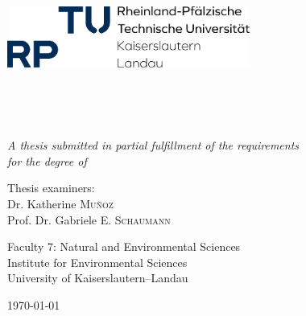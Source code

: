 \begin{titlepage}
\begin{center}

\includegraphics[width=0.6\textwidth]{figures/logo_rptu.png}

\vspace*{.06\textheight}

\end{center}

\begin{center}
\onehalfspacing
\HRule \\[0.2cm] %
{\huge \bfseries \ttitle\par}\vspace{0.2cm} %
\HRule \\[0.2cm] %
\vspace{1.2cm}
\end{center}

\begin{center}
{\LARGE \href{https://orcid.org/0000-0001-5468-6069}{\authorname}}

\vspace{1.2cm}

{\textsf{\large \textit{A thesis submitted in partial fulfillment of the requirements\\ for the degree of \degreename}}}

\vspace{1.5cm}
\vfill

{\textsf{Thesis examiners: \\
{Dr. Katherine \textsc{Muñoz}}\\
{Prof. Dr. Gabriele E. \textsc{Schaumann}}
}}

\vspace{0.8 cm}

\vfill

{\textsf{Faculty 7: Natural and Environmental Sciences\\
Institute for Environmental Sciences\\
University of Kaiserslautern--Landau}}

\vspace{1.2cm}

\vfill

{\Large \today}\\[4cm] %


\vfill

\end{center}
\end{titlepage}